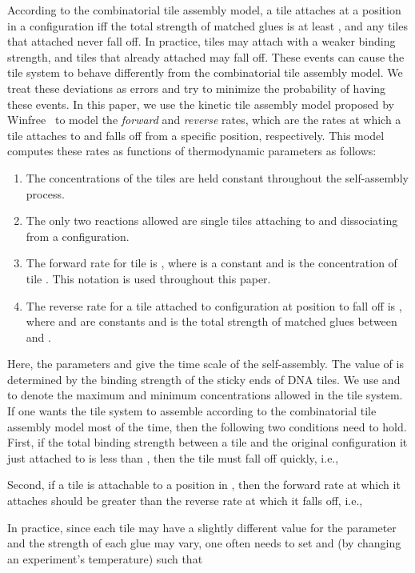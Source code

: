 \documentclass[11pt]{article}
\begin{document}
According to the combinatorial tile assembly model, a tile  attaches at a position  in a configuration  iff the total strength  of matched glues is at least , and any tiles that attached never fall off. In practice, tiles may attach with a weaker binding strength, and tiles that already attached may fall off. These events can cause the tile system to behave differently from the combinatorial tile assembly model. We treat these deviations as errors and try to minimize the probability of having these events. In this paper, we use the kinetic tile assembly model proposed by Winfree~\cite{w98:phd} to model the {\it forward} and {\it reverse} rates, which are the rates at which a tile attaches to and falls off from a specific position, respectively.
This model computes these rates as functions of thermodynamic parameters as follows: 

\begin{enumerate}
\item The concentrations of the tiles are held constant throughout the self-assembly process.
\item The only two reactions allowed are single tiles attaching to and dissociating from a configuration.
\item The forward rate for tile  is , where  is a constant and  is the concentration of tile . This notation is used throughout this paper.
\item The reverse rate for a tile  attached to configuration  at position  to fall off is , where  and  are constants and  is the total strength of matched glues between  and .
\end{enumerate}

Here, the parameters  and  give the time scale of the self-assembly. The value of  is determined by the binding strength of the sticky ends of DNA tiles. We use  and  to denote the maximum and minimum concentrations allowed in the tile system. If one wants the tile system to assemble according to the combinatorial tile assembly model most of the time, then the following two conditions need to hold. First, if the total binding strength between a tile and the original configuration it just attached to is less than , then the tile must fall off quickly, i.e.,

Second, if a tile  is attachable to a position in , then the forward rate at which it attaches should be greater than the reverse rate at which it falls off, i.e.,

In practice, since each tile may have a slightly different value for the parameter  and the strength of each glue may vary, one often needs to set  and  (by changing an experiment's temperature) such that 
\end{document}
